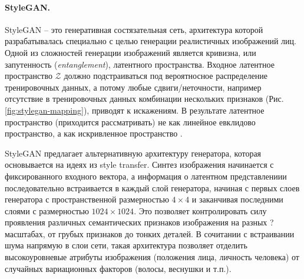 \paragraph{StyleGAN.}
StyleGAN \cite{StyleGAN} – это генеративная состязательная сеть, архитектура которой разрабатывалась специально с целью генерации реалистичных изображений лиц.
Одной из сложностей генерации изображений является кривизна, или запутенность (\emph{entanglement}), латентного пространства. 
Входное латентное пространство $\mathcal Z$ должно подстраиваться под вероятносное распределение тренировочных данных, а потому любые сдвиги/неточности, например отсутствие в тренировочных данных комбинации нескольких признаков (Рис. \ref{fig:stylegan-mapping}), приводят к искажениям.
В результате латентное пространство (приходится рассматривать) не как линейное евклидово пространство, а как искривленное пространство \cite{arvanitidis2018oddity}.

StyleGAN предлагает альтернативную архитектуру генератора, которая основывается на идеях из style transfer. 
Синтез изображения начинается с фиксированного входного вектора, а информация о латентном представлениии последовательно встраивается в каждый слой генератора, начиная с первых слоев генератора с пространственной размерностью $4\times4$ и заканчивая последними слоями с размерностью $1024\times1024$.
Это позволяет контролировать силу проявления различных семантических признаков изображения на разных ?масштабах, от грубых признаков до тонких деталей.
В сочитании с встраивании шума напрямую в слои сети, такая архитектура позволяет отделить высокоуровневые атрибуты изображения (положения лица, личность человека) от случайных вариационных факторов (волосы, веснушки и т.п.).


